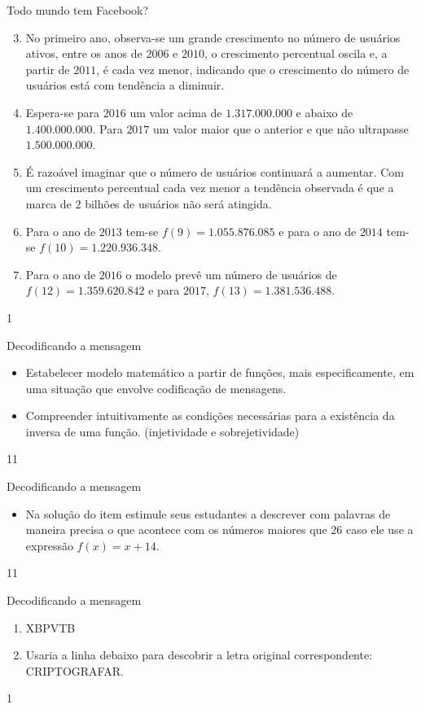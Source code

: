 \mspace{.25em}
\begin{answer}{Todo mundo tem Facebook?}
{
\begin{enumerate}\setcounter{enumi}{2}
\item No primeiro ano, observa-se um grande crescimento no número de usuários ativos, entre os anos de $2006$ e $2010$, o crescimento percentual oscila e, a partir de $2011$, é cada vez menor, indicando que o crescimento do número de usuários está com tendência a diminuir.

\item Espera-se para $2016$ um valor acima de $1.317.000.000$ e abaixo de $1.400.000.000$. Para $2017$ um valor maior que o anterior e que não ultrapasse $1.500.000.000$.

\item É razoável imaginar que o número de usuários continuará a aumentar. Com um crescimento percentual cada vez menor a tendência observada é que a marca de $2$ bilhões de usuários não será atingida.

\item Para o ano de $2013$ tem-se $f(9)=1.055.876.085$ e para o ano de $2014$ tem-se $f(10)=1.220.936.348$.

\item Para o ano de $2016$ o modelo prevê um número de usuários de $f(12)=1.359.620.842$ e para $2017$, $f(13)=1.381.536.488$.

\end{enumerate}
}{1}
\end{answer}
\clearmargin
\begin{objectives}{Decodificando a mensagem}
{
\begin{itemize}

\item Estabelecer modelo matemático a partir de funções, mais especificamente, em uma situação que envolve codificação de mensagens.

\item Compreender intuitivamente as condições necessárias para a existência da inversa de uma função. (injetividade e sobrejetividade)

\end{itemize}
}{1}{1}
\end{objectives}
\begin{sugestions}{Decodificando a mensagem}
{
\begin{itemize}
\item Na solução do item  estimule seus estudantes a descrever com palavras de maneira precisa o que acontece com os números maiores que $26$ caso ele use a expressão $f(x)=x+14$.
\end{itemize}
}{1}{1}
\end{sugestions}
\begin{answer}{Decodificando a mensagem}
{
\begin{enumerate}
\item XBPVTB

\item Usaria a linha debaixo para descobrir a letra original correspondente: CRIPTOGRAFAR.
\end{enumerate}
}{1}
\end{answer}

